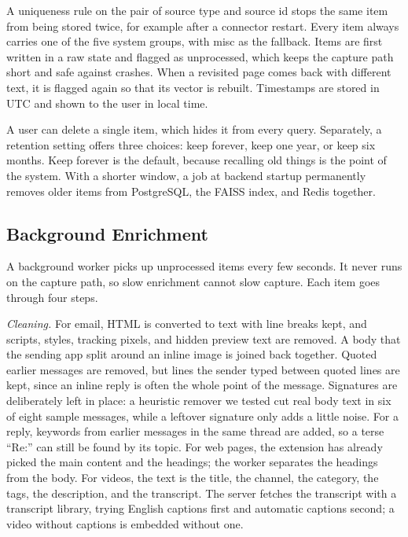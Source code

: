\documentclass[conference]{IEEEtran}
\begin{document}
A uniqueness rule on the pair of source type and source id stops the same item from being stored twice, for example after a connector restart. Every item always carries one of the five system groups, with misc as the fallback. Items are first written in a raw state and flagged as unprocessed, which keeps the capture path short and safe against crashes. When a revisited page comes back with different text, it is flagged again so that its vector is rebuilt. Timestamps are stored in UTC and shown to the user in local time.

A user can delete a single item, which hides it from every query. Separately, a retention setting offers three choices: keep forever, keep one year, or keep six months. Keep forever is the default, because recalling old things is the point of the system. With a shorter window, a job at backend startup permanently removes older items from PostgreSQL, the FAISS index, and Redis together.

\subsection{Background Enrichment}
A background worker picks up unprocessed items every few seconds. It never runs on the capture path, so slow enrichment cannot slow capture. Each item goes through four steps.

\textit{Cleaning.} For email, HTML is converted to text with line breaks kept, and scripts, styles, tracking pixels, and hidden preview text are removed. A body that the sending app split around an inline image is joined back together. Quoted earlier messages are removed, but lines the sender typed between quoted lines are kept, since an inline reply is often the whole point of the message. Signatures are deliberately left in place: a heuristic remover we tested cut real body text in six of eight sample messages, while a leftover signature only adds a little noise. For a reply, keywords from earlier messages in the same thread are added, so a terse ``Re:'' can still be found by its topic. For web pages, the extension has already picked the main content and the headings; the worker separates the headings from the body. For videos, the text is the title, the channel, the category, the tags, the description, and the transcript. The server fetches the transcript with a transcript library, trying English captions first and automatic captions second; a video without captions is embedded without one.
\end{document}
